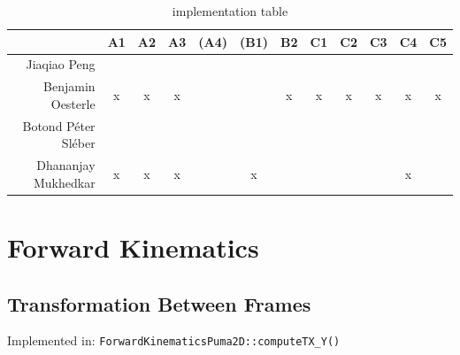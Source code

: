 \documentclass[a4paper,10pt]{article}
\begin{document}
\begin{table}[h!]
  \begin{center}
    \begin{tabular}{rccccccccccc}
               ~          & \textbf{A1} & \textbf{A2} & \textbf{A3} & \textbf{(A4)} & \textbf{(B1)} & \textbf{B2} & \textbf{C1} & \textbf{C2} & \textbf{C3} & \textbf{C4} & \textbf{C5}\\\hline
      Jiaqiao Peng        &      ~      &      ~      &      ~      &       ~       &       ~       &      ~      &      ~      &      ~      &      ~      &      ~      &      ~     \\\hline
      Benjamin Oesterle   &      x      &      x      &      x      &       ~       &       ~       &      x      &      x      &      x      &      x      &      x      &      x     \\\hline
      Botond Péter Sléber &      ~      &      ~      &      ~      &       ~       &       ~       &      ~      &      ~      &      ~      &      ~      &      ~      &      ~     \\\hline
      Dhananjay Mukhedkar &      x      &      x      &      x      &       ~       &       x       &      ~      &      ~      &      ~      &      ~      &      x      &      ~     \\\hline
      
    \end{tabular}
    \caption{implementation table}
  \end{center}
\end{table}

\newpage


\section{Forward Kinematics}

\subsection{Transformation Between Frames}

\vspace{-6mm}Implemented in: \texttt{ForwardKinematicsPuma2D::computeTX\_Y()}
\end{document}
